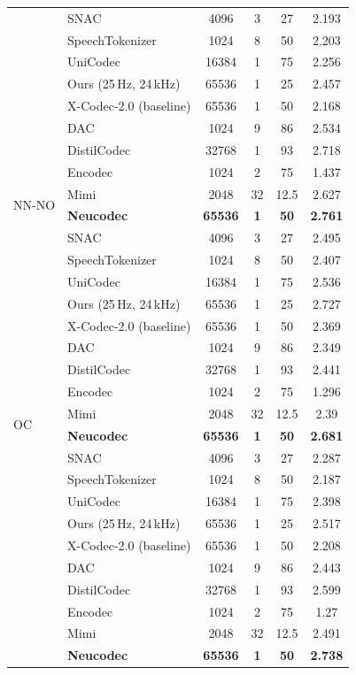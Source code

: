 \documentclass[preprint]{article}
\begin{document}
\begin{longtable}{llcccc}
  & SNAC & 4096 & 3 & 27 & 2.193 \\
  & SpeechTokenizer & 1024 & 8 & 50 & 2.203 \\
  & UniCodec & 16384 & 1 & 75 & 2.256 \\
  & Ours (25\,Hz, 24\,kHz) & 65536 & 1 & 25 & 2.457 \\
  & X-Codec-2.0 (baseline) & 65536 & 1 & 50 & 2.168 \\
\midrule
\multirow{8}{*}{NN-NO}
  & DAC & 1024 & 9 & 86 & 2.534 \\
  & DistilCodec & 32768 & 1 & 93 & 2.718 \\
  & Encodec & 1024 & 2 & 75 & 1.437 \\
  & Mimi & 2048 & 32 & 12.5 & 2.627 \\
  & \textbf{Neucodec} & \textbf{65536} & \textbf{1} & \textbf{50} & \textbf{2.761} \\
  & SNAC & 4096 & 3 & 27 & 2.495 \\
  & SpeechTokenizer & 1024 & 8 & 50 & 2.407 \\
  & UniCodec & 16384 & 1 & 75 & 2.536 \\
  & Ours (25\,Hz, 24\,kHz) & 65536 & 1 & 25 & 2.727 \\
  & X-Codec-2.0 (baseline) & 65536 & 1 & 50 & 2.369 \\
\midrule
\multirow{8}{*}{OC}
  & DAC & 1024 & 9 & 86 & 2.349 \\
  & DistilCodec & 32768 & 1 & 93 & 2.441 \\
  & Encodec & 1024 & 2 & 75 & 1.296 \\
  & Mimi & 2048 & 32 & 12.5 & 2.39 \\
  & \textbf{Neucodec} & \textbf{65536} & \textbf{1} & \textbf{50} & \textbf{2.681} \\
  & SNAC & 4096 & 3 & 27 & 2.287 \\
  & SpeechTokenizer & 1024 & 8 & 50 & 2.187 \\
  & UniCodec & 16384 & 1 & 75 & 2.398 \\
  & Ours (25\,Hz, 24\,kHz) & 65536 & 1 & 25 & 2.517 \\
  & X-Codec-2.0 (baseline) & 65536 & 1 & 50 & 2.208 \\
\newpage
\multirow{8}{*}{OR}
  & DAC & 1024 & 9 & 86 & 2.443 \\
  & DistilCodec & 32768 & 1 & 93 & 2.599 \\
  & Encodec & 1024 & 2 & 75 & 1.27 \\
  & Mimi & 2048 & 32 & 12.5 & 2.491 \\
  & \textbf{Neucodec} & \textbf{65536} & \textbf{1} & \textbf{50} & \textbf{2.738} \\

\end{longtable}
\end{document}
